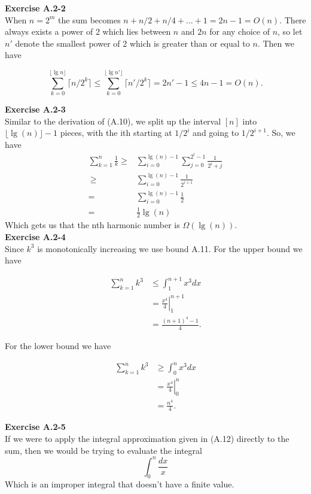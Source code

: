 \documentclass{article}
\begin{document}
\noindent\textbf{Exercise A.2-2}\\

When $n = 2^m$ the sum becomes $n + n/2 + n/4 + \ldots + 1 = 2n - 1 = O(n)$.  There always exists a power of 2 which lies between $n$ and $2n$ for any choice of $n$, so let $n'$ denote the smallest power of 2 which is greater than or equal to $n$.  Then we have

\[ \sum_{k=0}^{\lfloor \lg n \rfloor} \lceil n/2^k\rceil \leq \sum_{k=0}^{\lfloor \lg n' \rfloor} \lceil n'/2^k\rceil = 2n' - 1 \leq 4n - 1 = O(n).\]

\noindent\textbf{Exercise A.2-3}\\
Similar to the derivation of (A.10), we split up the interval $[n]$ into $\lfloor \lg(n)\rfloor-1$ pieces, with the ith starting at $1/2^i$ and going to $1/2^{i+1}$. So, we have
\begin{align*}
\sum_{k=1}^n \frac{1}{k} \ge& \sum_{i=0}^{\lg(n)-1} \sum_{j=0}^{2^i-1} \frac{1}{2^i+j}\\\
\ge& \sum_{i=0}^{\lg(n)-1} \frac{1}{2^{i+1}}\\
=&\sum_{i=0}^{\lg(n)-1} \frac{1}{2}\\
=&\frac{1}{2}\lg(n)
\end{align*}
Which gets us that the nth harmonic number is $\Omega(\lg(n))$.\\

\noindent\textbf{Exercise A.2-4}\\

Since $k^3$ is monotonically increasing we use bound A.11.  For the upper bound we have

\begin{align*}
\sum_{k=1}^n k^3 &\leq \int_1^{n+1} x^3 dx \\
&= \left.\frac{x^4}{4} \right|_1^{n+1} \\
&= \frac{(n+1)^4 - 1}{4}.
\end{align*}

For the lower bound we have 

\begin{align*}
\sum_{k=1}^n k^3 &\geq \int_0^{n} x^3 dx \\
&= \left.\frac{x^4}{4} \right|_0^n \\
&= \frac{n^4}{4}.
\end{align*}

\noindent\textbf{Exercise A.2-5}\\
If we were to apply the integral approximation given in (A.12) directly to the sum, then we would be trying to evaluate the integral
\[
\int_0^n \frac{dx}{x}
\]
Which is an improper integral that doesn't have a finite value.\\
\end{document}
